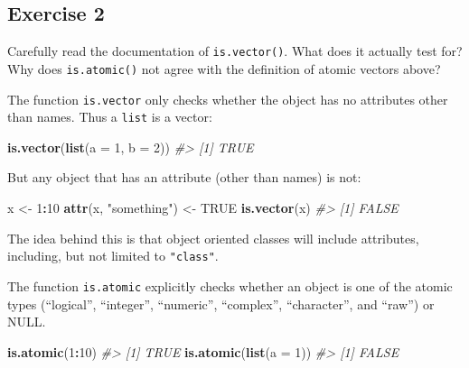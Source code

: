 \documentclass[]{book}
\newenvironment{Shaded}{\begin{snugshade}}{\end{snugshade}}
\newcommand{\CommentTok}[1]{\textcolor[rgb]{0.56,0.35,0.01}{\textit{#1}}}
\newcommand{\DataTypeTok}[1]{\textcolor[rgb]{0.13,0.29,0.53}{#1}}
\newcommand{\DecValTok}[1]{\textcolor[rgb]{0.00,0.00,0.81}{#1}}
\newcommand{\KeywordTok}[1]{\textcolor[rgb]{0.13,0.29,0.53}{\textbf{#1}}}
\newcommand{\NormalTok}[1]{#1}
\newcommand{\OperatorTok}[1]{\textcolor[rgb]{0.81,0.36,0.00}{\textbf{#1}}}
\newcommand{\OtherTok}[1]{\textcolor[rgb]{0.56,0.35,0.01}{#1}}
\newcommand{\StringTok}[1]{\textcolor[rgb]{0.31,0.60,0.02}{#1}}
\theoremstyle{definition}
\theoremstyle{definition}
\theoremstyle{definition}
\theoremstyle{remark}
\begin{document}
\hypertarget{exercise-2-48}{%
\subsection{Exercise 2}\label{exercise-2-48}}

Carefully read the documentation of \texttt{is.vector()}. What does it
actually test for? Why does \texttt{is.atomic()} not agree with the
definition of atomic vectors above?

The function \texttt{is.vector} only checks whether the object has no
attributes other than names. Thus a \texttt{list} is a vector:

\begin{Shaded}
\begin{Highlighting}[]
\KeywordTok{is.vector}\NormalTok{(}\KeywordTok{list}\NormalTok{(}\DataTypeTok{a =} \DecValTok{1}\NormalTok{, }\DataTypeTok{b =} \DecValTok{2}\NormalTok{))}
\CommentTok{#> [1] TRUE}
\end{Highlighting}
\end{Shaded}

But any object that has an attribute (other than names) is not:

\begin{Shaded}
\begin{Highlighting}[]
\NormalTok{x <-}\StringTok{ }\DecValTok{1}\OperatorTok{:}\DecValTok{10}
\KeywordTok{attr}\NormalTok{(x, }\StringTok{"something"}\NormalTok{) <-}\StringTok{ }\OtherTok{TRUE}
\KeywordTok{is.vector}\NormalTok{(x)}
\CommentTok{#> [1] FALSE}
\end{Highlighting}
\end{Shaded}

The idea behind this is that object oriented classes will include
attributes, including, but not limited to \texttt{"class"}.

The function \texttt{is.atomic} explicitly checks whether an object is
one of the atomic types (``logical'', ``integer'', ``numeric'',
``complex'', ``character'', and ``raw'') or NULL.

\begin{Shaded}
\begin{Highlighting}[]
\KeywordTok{is.atomic}\NormalTok{(}\DecValTok{1}\OperatorTok{:}\DecValTok{10}\NormalTok{)}
\CommentTok{#> [1] TRUE}
\KeywordTok{is.atomic}\NormalTok{(}\KeywordTok{list}\NormalTok{(}\DataTypeTok{a =} \DecValTok{1}\NormalTok{))}
\CommentTok{#> [1] FALSE}
\end{Highlighting}
\end{Shaded}
\end{document}
